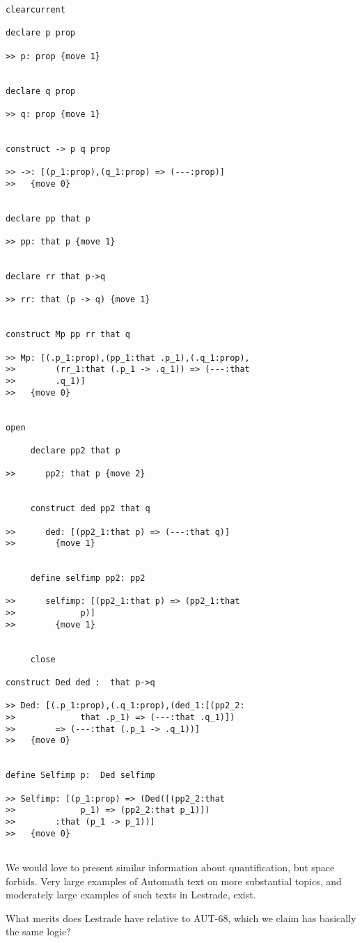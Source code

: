 \documentclass{article}
\begin{document}
\begin{verbatim}
clearcurrent

declare p prop

>> p: prop {move 1}


declare q prop

>> q: prop {move 1}


construct -> p q prop

>> ->: [(p_1:prop),(q_1:prop) => (---:prop)]
>>   {move 0}


declare pp that p

>> pp: that p {move 1}


declare rr that p->q

>> rr: that (p -> q) {move 1}


construct Mp pp rr that q

>> Mp: [(.p_1:prop),(pp_1:that .p_1),(.q_1:prop),
>>        (rr_1:that (.p_1 -> .q_1)) => (---:that 
>>        .q_1)]
>>   {move 0}


open

     declare pp2 that p

>>      pp2: that p {move 2}


     construct ded pp2 that q

>>      ded: [(pp2_1:that p) => (---:that q)]
>>        {move 1}


     define selfimp pp2: pp2

>>      selfimp: [(pp2_1:that p) => (pp2_1:that 
>>             p)]
>>        {move 1}


     close

construct Ded ded :  that p->q

>> Ded: [(.p_1:prop),(.q_1:prop),(ded_1:[(pp2_2:
>>             that .p_1) => (---:that .q_1)])
>>        => (---:that (.p_1 -> .q_1))]
>>   {move 0}


define Selfimp p:  Ded selfimp

>> Selfimp: [(p_1:prop) => (Ded([(pp2_2:that 
>>             p_1) => (pp2_2:that p_1)])
>>        :that (p_1 -> p_1))]
>>   {move 0}


\end{verbatim}

We would love to present similar information about quantification, but space forbids.  Very large examples of Automath text on more substantial topics, and moderately large examples of such texts in Lestrade, exist.

What merits does Lestrade have relative to AUT-68, which we claim has basically the same logic?
\end{document}
